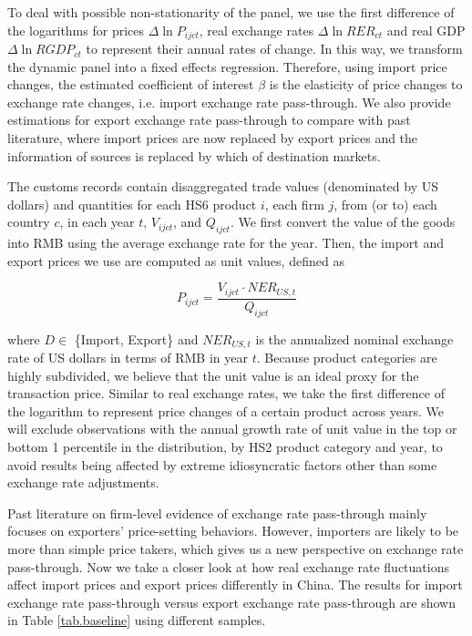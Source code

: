 \documentclass[12pt]{article}
\begin{document}
To deal with possible non-stationarity of the panel, we use the first difference of the logarithms for prices $\Delta \ln P_{i j c t}$, real exchange rates $\Delta \ln R E R_{c t}$ and real GDP $\Delta \ln R G D P_{c t}$ to represent their annual rates of change. In this way, we transform the dynamic panel into a fixed effects regression. Therefore, using import price changes, the estimated coefficient of interest $\beta$ is the elasticity of price changes to exchange rate changes, i.e. import exchange rate pass-through. We also provide estimations for export exchange rate pass-through to compare with past literature, where import prices are now replaced by export prices and the information of sources is replaced by which of destination markets.

The customs records contain disaggregated trade values (denominated by US dollars) and quantities for each HS6 product $i$, each firm $j$, from (or to) each country $c$, in each year $t$, $V_{ijct}$, and $Q_{ijct}$. We first convert the value of the goods into RMB using the average exchange rate for the year. Then, the import and export prices we use are computed as unit values, defined as 

$$
P_{ijct}=\frac{V_{ijct}\cdot NER_{US,t}}{Q_{ijct}}
$$

where $D \in$ \{Import, Export\} and $NER_{US,t}$ is the annualized nominal exchange rate of US dollars in terms of RMB in year $t$. Because product categories are highly subdivided, we believe that the unit value is an ideal proxy for the transaction price. Similar to real exchange rates, we take the first difference of the logarithm to represent price changes of a certain product across years. We will exclude observations with the annual growth rate of unit value in the top or bottom 1 percentile in the distribution, by HS2 product category and year, to avoid results being affected by extreme idiosyncratic factors other than some exchange rate adjustments.

Past literature on firm-level evidence of exchange rate pass-through mainly focuses on exporters' price-setting behaviors. However, importers are likely to be more than simple price takers, which gives us a new perspective on exchange rate pass-through. Now we take a closer look at how real exchange rate fluctuations affect import prices and export prices differently in China. The results for import exchange rate pass-through versus export exchange rate pass-through are shown in Table \ref{tab.baseline} using different samples.
\end{document}
